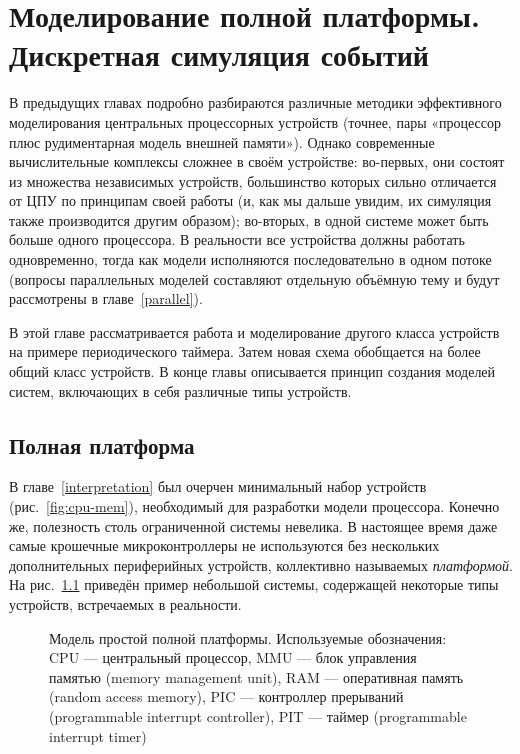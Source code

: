\chapter[Моделирование полной платформы]{Моделирование полной платформы. Дискретная симуляция событий}\label{fullplatform}


В предыдущих главах подробно разбираются различные методики эффективного моделирования центральных процессорных устройств (точнее, пары «процессор плюс рудиментарная модель внешней памяти»). Однако современные вычислительные комплексы сложнее в своём устройстве: во-первых, они  состоят из множества независимых устройств, большинство которых сильно отличается от ЦПУ по принципам своей работы (и, как мы дальше увидим, их симуляция также производится  другим образом); во-вторых, в одной системе может быть больше одного процессора. В реальности все устройства должны работать одновременно, тогда как модели исполняются последовательно в одном потоке (вопросы параллельных моделей составляют отдельную объёмную тему и будут рассмотрены в главе~\ref{parallel}).

В этой главе рассматривается работа и моделирование другого класса устройств на примере периодического таймера. Затем новая схема обобщается на более общий класс устройств. В конце главы описывается принцип создания моделей систем, включающих в себя различные типы устройств.

\section{Полная платформа}

В главе~\ref{interpretation} был очерчен минимальный набор устройств (рис. \ref{fig:cpu-mem}), необходимый для разработки модели процессора. Конечно же, полезность столь ограниченной системы невелика. В настоящее время даже самые крошечные микроконтроллеры не используются без нескольких дополнительных периферийных устройств, коллективно называемых \textit{платформой}. На рис.~\ref{fig:full-platform} приведён пример небольшой системы, содержащей некоторые типы устройств, встречаемых в реальности.

\begin{figure}[htp]
    \centering
    \caption[Модель простой полной платформы]{Модель простой полной платформы. Используемые обозначения: CPU --- центральный процессор, MMU --- блок управления памятью (\abbr memory management unit), RAM --- оперативная память (\abbr random access memory), PIC --- контроллер прерываний (\abbr programmable interrupt controller), PIT --- таймер (\abbr programmable interrupt timer)}
    \label{fig:full-platform}
\end{figure}

